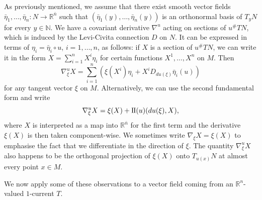 \documentclass[10pt,a4paper]{amsart}
\newcommand{\R}{\mathbb{R}}
\newcommand{\N}{\mathbb{N}}
\newcommand{\ndim}{{\bar{n}}}
\newcommand{\sff}{\mathrm{I{\mkern -1mu}I}}
\begin{document}
As previously mentioned, we assume that there exist smooth vector fields
$\bar{\eta}_1, \dotsc, \bar{\eta}_n \colon N \to \R^{\bar{n}}$ such that $(\bar{\eta}_1(y), \dotsc, \bar{\eta}_n(y))$ is an
orthonormal basis of $T_y N$ for every $y \in \N$.
We have a covariant derivative $\nabla^u$ acting on sections of $u^\# TN$,
which is induced by the Levi-Civita connection $D$ on $N$.
It can be expressed in terms of $\eta_i = \bar{\eta}_i \circ u$, $i = 1, \dotsc, n$, as follows: if $X$ is a section of $u^\# TN$, we can write it in the form $X = \sum_{i = 1}^n X^i \eta_i$ for certain functions $X^1, \dotsc, X^n$ on $M$.
Then
\[
\nabla_\xi^u X = \sum_{i = 1}^n \left(\xi(X^i) \eta_i + X^i D_{du(\xi)} \bar{\eta}_i(u)\right)
\]
for any tangent vector $\xi$ on $M$.
Alternatively, we can use the second fundamental form and write
\[
\nabla_\xi^u X = \xi(X) + \sff(u)(du(\xi), X),
\]
where $X$ is interpreted as a map into $\R^\ndim$ for the first term and the derivative $\xi(X)$ is then taken component-wise. We sometimes write
$\nabla_\xi X = \xi(X)$ to emphasise the fact that we differentiate in the direction
of $\xi$. The quantity $\nabla_\xi^u X$ also happens to be
the orthogonal projection of $\xi(X)$ onto $T_{u(x)} N$ at almost every point $x \in M$.

We now apply some of these observations to a vector field coming from
an $\R^n$-valued $1$-current $T$.
\end{document}
